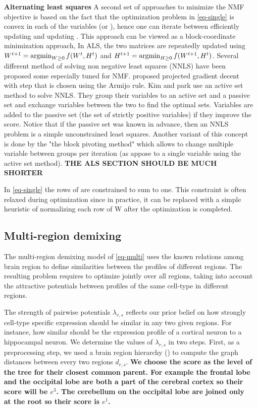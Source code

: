 {\bf{Alternating least squares}} A second set of approaches to minimize the NMF objective is based on the fact that the optimization problem in \eqref{eq-single} is convex in each of the variables \W (or \Htext), hence one can iterate between efficiently updating \W and updating \Htext. This approach can be viewed as a block-coordinate minimization approach, In ALS, the two matrices are  repeatedly updated using $ W^{t+1} = \argmin_{W \geq 0 } f(W^t, H^t)$ and $H^{t+1} = \argmin_{H \geq 0 } f(W^{t+1},H^t)$. Several different method of solving non negative least squares (NNLS) have been proposed some especially tuned for NMF. \citet{lin2007projected} proposed projected gradient decent with step that is chosen using the Armijo rule. 
Kim and park \cite{kim2008activeset,kim2011fast} use an active set method to solve NNLS. They group their variables to an active set and a passive set and 
exchange variables between the two to find the optimal sets. Variables are added to the passive set (the set of strictly positive variables) if they improve the score. Notice that if the passive set was known in advance, then an NNLS problem is a simple unconstrained least squares. Another variant of this concept is done by the "the block pivoting method" which allows to change multiple variable between groups per iteration (as appose to a single variable using the active set method). {\bf{THE ALS SECTION SHOULD BE MUCH SHORTER}}

In \eqref{eq-single} the rows of \W are constrained to sum to one. This constraint is often relaxed during optimization since in practice, it can be replaced with a simple heuristic of normalizing each row of W after the optimization is completed. 


\subsection{Multi-region demixing}
The multi-region demixing model of \eqref{eq-multi} uses the known relations among brain region to define similarities between the profiles of different regions. The resulting problem requires to optimize jointly over all regions, taking into account the attractive potentials between profiles of the same cell-type in different regions. 

The strength of pairwise potentials $\lambda_{r,s}$ reflects our prior belief on how strongly cell-type specific expression should be similar in any two given regions. For instance, how similar should be the expression profile of a cortical neuron to a hippocampal neuron.
We determine the values of $\lambda_{r,s}$ in two steps. First, as a preprocessing step, we used a brain region hierarchy () to compute the graph distances between every two regions $d_{r,s}$. {\bf{We choose the score as the level of the tree for their closest common parent. For example the frontal lobe and the occipital lobe are both a part of the cerebral cortex so their score will be $e^3$. The cerebellum on the occipital lobe are joined only at the root so their score is $e^1$. }}


